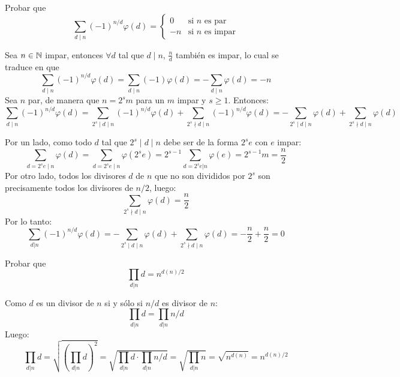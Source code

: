 \documentclass[twoside]{article}
\begin{document}
\begin{ejercicio}{13}
Probar que	
\[
\sum_{d\mid n} (-1)^{n/d}\varphi(d) = 
\begin{cases}
0 & \text{si $n$ es par}\\ 
-n & \text{si $n$ es impar}
\end{cases}
\]
\begin{sol}
Sea $n \in \mathbb{N}$ impar, entonces $\forall d$ tal que $d \mid n$, $\frac{n}{d}$ también es impar, lo cual se traduce en que
\[
\sum_{d\mid n} (-1)^{n/d}\varphi(d) = \sum_{d\mid n} (-1)\varphi(d) = -\sum_{d\mid n}\varphi(d) = -n
\]
Sea $n$ par, de manera que $n=2^sm$ para un $m$ impar y $s ≥ 1$. Entonces:
\[ \sum_{d\mid n}(-1)^{n/d}φ(d) =  \sum_{2^s\mid d \mid n}(-1)^{n/d}φ(d) +  \sum_{2^s\nmid d \mid n}(-1)^{n/d}φ(d) = -\sum_{2^s\mid d \mid n}φ(d) + \sum_{2^s\nmid d \mid n}φ(d) \]

Por un lado, como todo $d$ tal que $2^s\mid d \mid n$ debe ser de la forma $2^se$ con $e$ impar:
\[ \sum_{d=2^se \mid n} φ(d) = \sum_{d=2^se \mid n} φ(2^se) = 2^{s-1}\sum_{d=2^se|n} φ(e) = 2^{s-1}m = \frac{n}{2}\]
Por otro lado, todos los divisores $d$ de $n$ que no son divididos por $2^s$ son precisamente todos los divisores de $n/2$, luego:
\[ \sum_{2^s\nmid d \mid n}φ(d) = \frac{n}{2} \]
Por lo tanto:
\[ \sum_{d|n} (-1)^{n/d}φ(d) = -\sum_{2^s\mid d\mid n}φ(d)+\sum_{2^s\nmid d\mid n}φ(d) = -\frac{n}{2}+\frac{n}{2}=0\]
\end{sol}

\newpage

\begin{ejercicio}{15}
Probar que
\[ \prod_{d|n} d = n^{d(n)/2} \]
\end{ejercicio}

\begin{sol}
Como $d$ es un divisor de $n$ si y sólo si $n/d$ es divisor de $n$:
\[ \prod_{d|n} d = \prod_{d|n} n/d \]
Luego:
\[ \prod_{d|n} d = \sqrt{\left(\prod_{d|n} d\right)^2} = \sqrt{\prod_{d|n} d \cdot \prod_{d|n} n/d} = \sqrt{\prod_{d|n} n} = \sqrt{n^{d(n)}} = n^{d(n)/2} \]
\end{sol}
\end{ejercicio}
\end{document}
